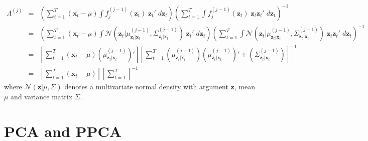 \documentclass[12pt]{article}
\theoremstyle{definition}
\begin{document}
	\begin{eqnarray*}
		\Lambda^{(j)} &=& \left(\sum_{t = 1}^T  (\textbf{x}_t - \mu)\int f_j^{(j-1)}(\mathbf{z}_t) \; \textbf{z}_t' \; d \mathbf{z}_t\right) \left(\sum_{t=1}^T \int f_j^{(j-1)}(\mathbf{z}_t)\; \textbf{z}_t \textbf{z}_t' \; d \mathbf{z}_t\right)^{-1}\\
			&=&\left(\sum_{t = 1}^T  (\textbf{x}_t - \mu)\int \mathcal{N}\left(\mathbf{z}_t|\mu^{(j-1)}_{\mathbf{z}_t|\mathbf{x}_t}, \Sigma^{(j-1)}_{\mathbf{z}_t|\mathbf{x}_t}\right) \; \textbf{z}_t' \; d \mathbf{z}_t\right) \left(\sum_{t=1}^T \int \mathcal{N}\left(\mathbf{z}_t|\mu^{(j-1)}_{\mathbf{z}_t|\mathbf{x}_t}, \Sigma^{(j-1)}_{\mathbf{z}_t|\mathbf{x}_t}\right)\; \textbf{z}_t \textbf{z}_t' \; d \mathbf{z}_t\right)^{-1}\\
			&=& \left[\sum_{t=1}^T (\mathbf{x}_t - \mu)\left(\mu^{(j-1)}_{\mathbf{z}_t|\mathbf{x}_t} \right)'\right]\left[\sum_{t=1}^T \left(\mu^{(j-1)}_{\mathbf{z}_t|\mathbf{x}_t} \right)\left(\mu^{(j-1)}_{\mathbf{z}_t|\mathbf{x}_t} \right)' + \left(\Sigma^{(j-1)}_{\mathbf{z}_t|\mathbf{x}_t} \right)   \right]^{-1}\\
			&=&\left[\sum_{t=1}^T (\mathbf{x}_t - \mu) \right] \left[\sum_{t=1}^T \right]^{-1}
	\end{eqnarray*}
where $\mathcal{N}(\mathbf{z}|\mu, \Sigma)$ denotes a multivariate normal density with argument $\mathbf{z}$, mean $\mu$ and variance matrix $\Sigma$.

\section{PCA and PPCA}
\end{document}
